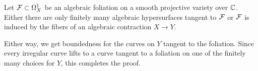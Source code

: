 \documentclass[main.tex]{subfiles}
\begin{document}
\begin{theorem}
Let $\mathcal{F} \subset \Omega_X^1$ be an algebraic foliation on a smooth projective variety over $\mathbb{C}$. Either there are only finitely many algebraic hypersurfaces tangent to $\mathcal{F}$ or $\mathcal{F}$ is induced by the fibers of an algebraic contraction $X \to Y$.
\end{theorem}

Either way, we get boundedness for the curves on $Y$ tangent to the foliation. Since every irregular curve lifts to a curve tangent to a foliation on one of the finitely many choices for $Y$, this completes the proof.

\ifSubfilesClassLoaded{%
  
  
}{}
\end{document}
